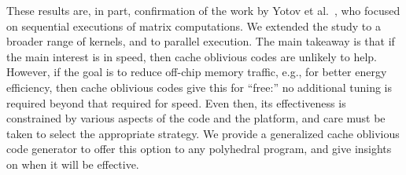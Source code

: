 These results are, in part, confirmation of the work by Yotov et
al.~\cite{yotov2007experimental}, who focused on sequential executions of
matrix computations.  We extended the study to a broader range of kernels, and
to parallel execution.  The main takeaway is that if the main interest is in
speed, then cache oblivious codes are unlikely to help.  However, if the
goal is to reduce off-chip memory traffic, e.g., for better energy
efficiency, then cache oblivious codes give this for ``free:'' no additional
tuning is required beyond that required for speed.  Even then, its
effectiveness is constrained by various aspects of the code and the platform,
and care must be taken to select the appropriate strategy.  We provide a
generalized cache oblivious code generator to offer this option to any
polyhedral program, and give insights on when it will be effective.

